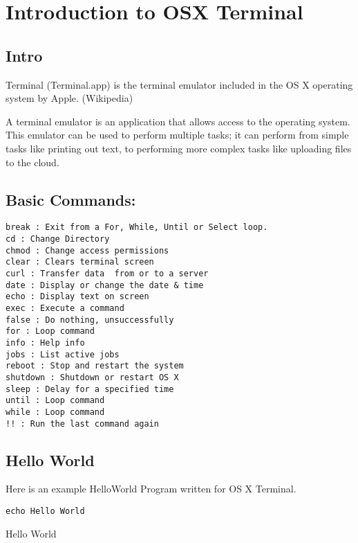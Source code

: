 \chapter{Introduction to OSX Terminal}

\section{Intro}
Terminal (Terminal.app) is the terminal emulator included in the OS X operating system by Apple. (Wikipedia)

A terminal emulator is an application that allows access to the operating system. This emulator can be used to perform multiple tasks; it can perform from simple tasks like printing out text, to performing more complex tasks like uploading files to the cloud.

\section{Basic Commands:}
\begin{verbatim}
break : Exit from a For, While, Until or Select loop.
cd : Change Directory
chmod : Change access permissions
clear : Clears terminal screen
curl : Transfer data  from or to a server
date : Display or change the date & time
echo : Display text on screen
exec : Execute a command
false : Do nothing, unsuccessfully
for : Loop command
info : Help info
jobs : List active jobs
reboot : Stop and restart the system
shutdown : Shutdown or restart OS X
sleep : Delay for a specified time
until : Loop command
while : Loop command
!! : Run the last command again
\end{verbatim}

\section{Hello World}
Here is an example HelloWorld Program written for OS X Terminal.

\begin{shaded}
\begin{verbatim}
echo Hello World
\end{verbatim}
\end{shaded}

\begin{framed}
Hello World
\end{framed}